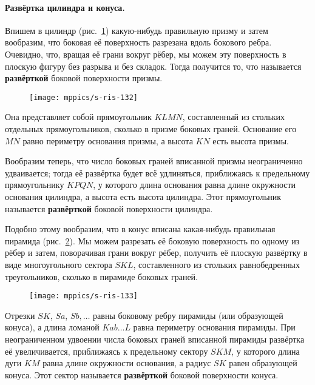 \paragraph{Развёртка цилиндра и конуса.}\label{1938/s118}
Впишем в цилиндр (рис.~\ref{1938/s-ris-132}) какую-нибудь правильную призму и затем вообразим, что боковая её поверхность разрезана вдоль бокового ребра.
Очевидно, что, вращая её грани вокруг рёбер, мы можем  эту поверхность в плоскую фигуру без разрыва и без складок.
Тогда получится то, что называется \textbf{развёрткой} боковой поверхности призмы.
\begin{figure}[!ht]
\vskip-0mm
\centering
\texttt{[image: mppics/s-ris-132]}
\caption{}\label{1938/s-ris-132}
\vskip-0mm
\end{figure}
Она представляет собой прямоугольник $KLMN$, составленный из стольких отдельных прямоугольников, сколько в призме боковых граней.
Основание его $MN$ равно периметру основания призмы, а высота $KN$ есть высота призмы.

Вообразим теперь, что число боковых граней вписанной призмы неограниченно удваивается;
тогда её развёртка будет всё удлиняться, приближаясь к предельному прямоугольнику $KPQN$, у которого длина основания равна длине окружности основания цилиндра, а высота есть высота цилиндра.
Этот прямоугольник называется \textbf{развёрткой} боковой поверхности цилиндра.

Подобно этому вообразим, что в конус вписана какая-нибудь правильная пирамида (рис.~\ref{1938/s-ris-133}).
Мы можем разрезать её боковую поверхность по одному из рёбер и затем, поворачивая грани вокруг рёбер, получить её плоскую развёртку в виде многоугольного сектора $SKL$, составленного из стольких равнобедренных треугольников, сколько в пирамиде боковых граней.
\begin{figure}[!ht]
\vskip-0mm
\centering
\texttt{[image: mppics/s-ris-133]}
\caption{}\label{1938/s-ris-133}
\vskip-0mm
\end{figure}
Отрезки $SK$, $Sa$, $Sb,\dots$ равны боковому ребру пирамиды (или образующей конуса), а длина ломаной $Kab\dots L$ равна периметру основания пирамиды.
При неограниченном удвоении числа боковых граней вписанной пирамиды развёртка её увеличивается, приближаясь к предельному сектору $SKM$, у которого длина дуги $KM$ равна длине окружности основания, а радиус $SK$ равен образующей конуса.
Этот сектор называется \textbf{развёрткой} боковой поверхности конуса.

